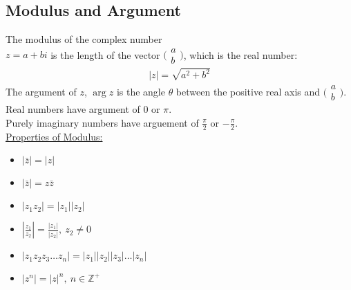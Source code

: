 \documentclass[10pt, a4paper, titlepage]{article}
\begin{document}
\begin{multicols*}{3}
\dotfill
\subsection{Modulus and Argument}
The modulus of the complex number \\$z=a+bi$ is the length of the vector $\big(\begin{smallmatrix}a\\ b\end{smallmatrix}\big)$, which is the real number:
\begin{align}
	|z|=\sqrt{a^2+b^2}
\end{align}
The argument of $z$, $\arg{z}$ is the angle $\theta$ between the positive real axis and $\big(\begin{smallmatrix}a\\ b\end{smallmatrix}\big)$.\\
Real numbers have argument of 0 or $\pi$.\\
Purely imaginary numbers have arguement of $\frac{\pi}{2}$ or $-\frac{\pi}{2}$.\\

\underline{Properties of Modulus:}
\begin{itemize}
	\item $|\bar{z}|=|z|$
	\item $|\bar{z}|=z\bar{z}$
	\item $|z_1z_2|=|z_1||z_2|$
	\item $\left|\frac{z_1}{z_2}\right|=\frac{|z_1|}{|z_2|},\ z_2\neq 0$
	\item $|z_1z_2z_3\dots z_n|=|z_1||z_2||z_3|\dots |z_n|$
	\item $|z^n|=|z|^n,\ n\in \mathbb{Z}^+$
\end{itemize}
\dotfill

\end{multicols*}
\end{document}
